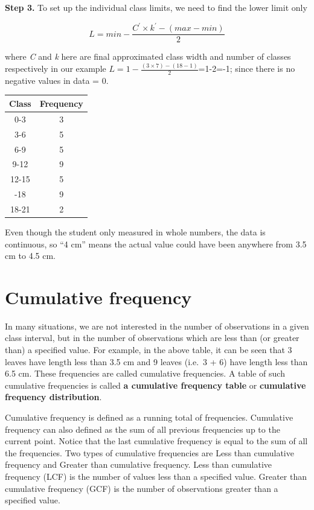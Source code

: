 \documentclass[
]{book}
\begin{document}
\textbf{Step 3.} To set up the individual class limits, we need to find the
lower limit only

\[L = min - \frac{C^{'} \times k^{'} - (max - min)}{2}\]

where \emph{C} and \emph{k} here are final approximated class width and number of
classes respectively in our example
\(L = 1 - \frac{(3 \times 7) - (18 - 1)}{2}\)=1-2=-1; since there is no
negative values in data = 0.

\begin{table}[H]
\centering\centering
\begin{tabular}[t]{cc}
\toprule
Class & Frequency\\
\midrule
0-3 & 3\\
3-6 & 5\\
6-9 & 5\\
9-12 & 9\\
12-15 & 5\\
\addlinespace
15-18 & 9\\
18-21 & 2\\
\bottomrule
\end{tabular}
\end{table}

Even though the student only measured in whole numbers, the data is
continuous, so ``4 cm'' means the actual value could have been anywhere
from 3.5 cm to 4.5 cm.

\section{Cumulative frequency}\label{cumulative-frequency}

In many situations, we are not interested in the number of observations
in a given class interval, but in the number of observations which are
less than (or greater than) a specified value. For example, in the above
table, it can be seen that 3 leaves have length less than 3.5 cm and 9
leaves (i.e.~3 + 6) have length less than 6.5 cm. These frequencies are
called cumulative frequencies. A table of such cumulative frequencies is
called \textbf{a cumulative frequency table} or \textbf{cumulative frequency
distribution}.

Cumulative frequency is defined as a running total of frequencies.
Cumulative frequency can also defined as the sum of all previous
frequencies up to the current point. Notice that the last cumulative
frequency is equal to the sum of all the frequencies. Two types of
cumulative frequencies are Less than cumulative frequency and Greater
than cumulative frequency. Less than cumulative frequency (LCF) is the
number of values less than a specified value. Greater than cumulative
frequency (GCF) is the number of observations greater than a specified
value.
\end{document}
